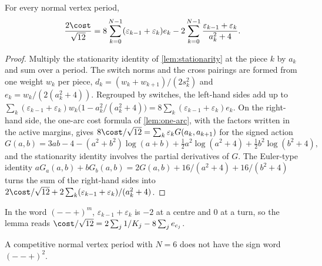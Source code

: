 \begin{lemma}\label{lem:m1-euler}
  For every normal vertex period,
  \[
    \frac{2\cost}{\sqrt{12}}
    =8\sum_{k=0}^{N-1}(\varepsilon_{k-1}+\varepsilon_k)e_k
      -2\sum_{k=0}^{N-1}\frac{\varepsilon_{k-1}+\varepsilon_k}{a_k^2+4}.
  \]
\end{lemma}

\begin{proof}
  Multiply the stationarity identity of \cref{lem:stationarity} at the piece $k$ by $a_k$ and sum
  over a period. The switch norms and the cross pairings are formed from one weight $w_k$ per piece,
  $d_k=(w_k+w_{k+1})/(2s_k^2)$ and $e_k=w_k/(2(a_k^2+4))$. Regrouped by switches, the left-hand
  sides add up to $\sum_k(\varepsilon_{k-1}+\varepsilon_k)w_k\bigl(1-a_k^2/(a_k^2+4)\bigr)
  =8\sum_k(\varepsilon_{k-1}+\varepsilon_k)e_k$. On the right-hand side, the one-arc cost formula
  of \cref{lem:one-arc}, with the factors written in the active margins, gives
  $8\cost/\sqrt{12}=\sum_k\varepsilon_kG(a_k,a_{k+1})$ for the signed action
  \[
    G(a,b)=3ab-4-(a^2+b^2)\log(a+b)+\tfrac12a^2\log(a^2+4)+\tfrac12b^2\log(b^2+4),
  \]
  and the stationarity identity involves the partial derivatives of $G$. The Euler-type identity
  $aG_a(a,b)+bG_b(a,b)=2G(a,b)+16/(a^2+4)+16/(b^2+4)$ turns the sum of the right-hand sides into
  $2\cost/\sqrt{12}+2\sum_k(\varepsilon_{k-1}+\varepsilon_k)/(a_k^2+4)$.
\end{proof}

In the word $(--+)^m$, $\varepsilon_{k-1}+\varepsilon_k$ is $-2$ at a centre and $0$ at a turn,
so the lemma reads $\cost/\sqrt{12}=2\sum_j1/K_j-8\sum_je_{c_j}$.

\begin{proposition}\label{prop:m1-two-centre}
  A competitive normal vertex period with $N=6$ does not have the sign word $(--+)^2$.
\end{proposition}

